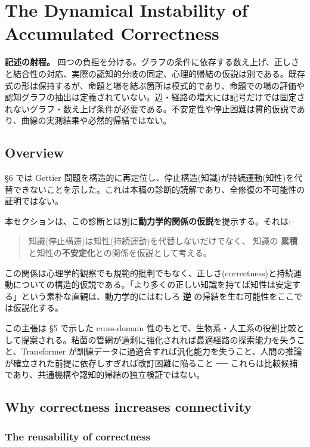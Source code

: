 \section{The Dynamical Instability of Accumulated Correctness}

\noindent\textbf{記述の射程。} 四つの負担を分ける。グラフの条件に依存する数え上げ、正しさと結合性の対応、実際の認知的分岐の同定、心理的帰結の仮説は別である。既存式の形は保持するが、命題と場を結ぶ箇所は模式的であり、命題での場の評価や認知グラフの抽出は定義されていない。辺・経路の増大には記号だけでは固定されないグラフ・数え上げ条件が必要である。不安定性や停止困難は質的仮説であり、曲線の実測結果や必然的帰結ではない。



\subsection{Overview}


\S{}6 では Gettier 問題を構造的に再定位し、停止構造(知識)が持続運動(知性)を代替できないことを示した。これは本稿の診断的読解であり、全修復の不可能性の証明ではない。

本セクションは、この診断とは別に\textbf{動力学的関係の仮説}を提示する。それは:

\begin{quote}
知識(停止構造)は知性(持続運動)を代替しないだけでなく、
知識の \textbf{累積} と知性の\textbf{不安定化}との関係を仮説として考える。
\end{quote}

この関係は心理学的観察でも規範的批判でもなく、正しさ(correctness)と持続運動についての構造的仮説である。「より多くの正しい知識を持てば知性は安定する」という素朴な直観は、動力学的にはむしろ \textbf{逆} の帰結を生む可能性をここでは仮説化する。

この主張は \S{}5 で示した cross-domain 性のもとで、生物系・人工系の役割比較として提案される。粘菌の管網が過剰に強化されれば最適経路の探索能力を失うこと、Transformer が訓練データに過適合すれば汎化能力を失うこと、人間の推論が確立された前提に依存しすぎれば改訂困難に陥ること ── これらは比較候補であり、共通機構や認知的帰結の独立検証ではない。

\subsection{Why correctness increases connectivity}


\subsubsection{The reusability of correctness}


